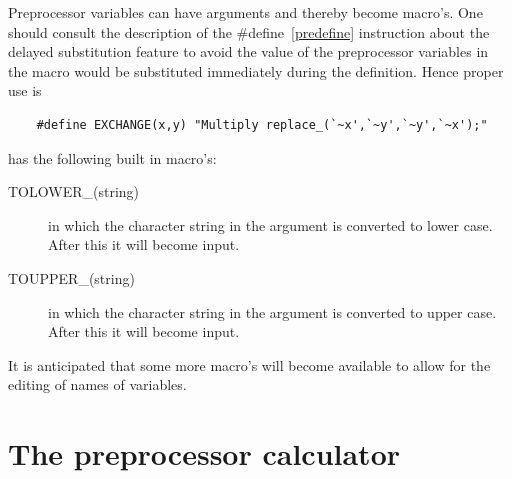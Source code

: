 \noindent Preprocessor variables can have arguments and thereby become 
macro's. One should consult the description of the \#define~\ref{predefine} 
instruction about the delayed substitution feature to avoid the value of 
the preprocessor variables in the macro would be substituted immediately 
during the definition. Hence proper use is
\begin{verbatim}
    #define EXCHANGE(x,y) "Multiply replace_(`~x',`~y',`~y',`~x');"
\end{verbatim}

\noindent \FORM{} has the following built in macro's:
\begin{description}
\item[TOLOWER\_(string)] in which the character string in the argument is 
converted to lower case. After this it will become input.
\item[TOUPPER\_(string)] in which the character string in the argument is 
converted to upper case. After this it will become input.
\end{description}
It is anticipated that some more macro's will become available to allow for 
the editing of names of variables.

\section{The preprocessor calculator}
\label{calculator}

